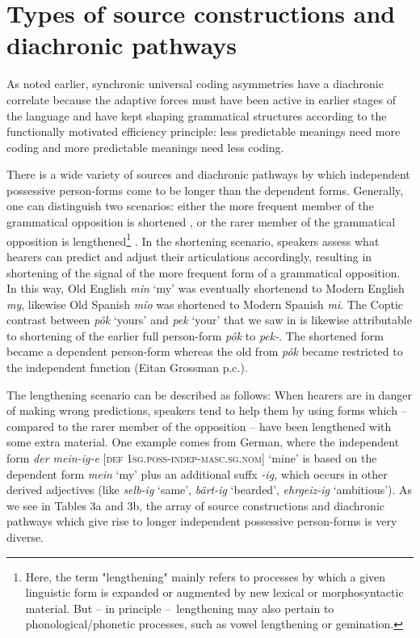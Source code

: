\documentclass[output=paper]{langsci/langscibook}
\begin{document}
\section{Types of source constructions and diachronic pathways}

As noted earlier, synchronic universal coding asymmetries have a diachronic correlate because the adaptive forces must have been active in earlier stages of the language and have kept shaping grammatical structures according to the functionally motivated efficiency principle: less predictable meanings need more coding and more predictable meanings need less coding.

There is a wide variety of sources and diachronic pathways by which independent possessive person-forms come to be longer than the dependent forms. Generally, one can distinguish two scenarios: either the more frequent member of the grammatical opposition is shortened \citep{Bybee2007}, or the rarer member of the grammatical opposition is lengthened\footnote{Here, the term "lengthening" mainly refers to processes by which a given linguistic form is expanded or augmented by new lexical or morphosyntactic material. But – in principle –~lengthening may also pertain to phonological/phonetic processes, such as vowel lengthening or gemination.} \citep{Haspelmath2008}. In the shortening scenario, speakers assess what hearers can predict and adjust their articulations accordingly, resulting in shortening of the signal of the more frequent form of a grammatical opposition. In this way, Old English \textit{min} `my' was eventually shortenend to Modern English \textit{my}, likewise Old Spanish \textit{mío} was shortened to Modern Spanish \textit{mi}. The Coptic contrast between \textit{pôk} `yours' and \textit{pek} `your' that we saw in  is likewise attributable to shortening of the earlier full person-form \textit{pôk} to \textit{pek-}. The shortened form became a dependent person-form whereas the old from \textit{pôk} became restricted to the independent function (Eitan Grossman p.c.).

The lengthening scenario can be described as follows: When hearers are in danger of making wrong predictions, speakers tend to help them by using forms which – compared to the rarer member of the opposition – have been lengthened with some extra material. One example comes from German, where the independent form \textit{der mein-ig-e} [\textsc{def} \textsc{1sg.poss-indep-masc.sg.nom}] ‘mine’ is based on the dependent form \textit{mein} `my' plus an additional suffx \textit{{}-ig,} which occurs in other derived adjectives (like \textit{selb-ig} `same', \textit{bärt-ig} `bearded', \textit{ehrgeiz-ig} `ambitious'). As we see in Tables 3a and 3b, the array of source constructions and diachronic pathways which give rise to longer independent possessive person-forms is very diverse.
\end{document}
